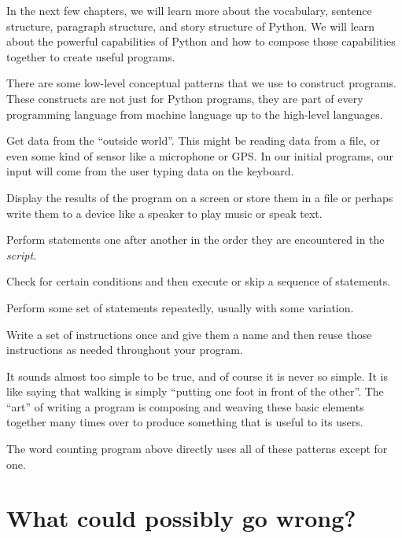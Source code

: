 In the next few chapters, we will learn more about the vocabulary, sentence structure, paragraph structure, and story structure of Python. We will learn about the powerful capabilities of Python and how to compose those capabilities together to create useful programs.

There are some low-level conceptual patterns that we use to construct programs. These constructs are not just for Python programs, they are part of every programming language from machine language up to the high-level languages.

\begin{description}
\tightlist
\item[input]
Get data from the ``outside world''. This might be reading data from a file, or even some kind of sensor like a microphone or GPS. In our initial programs, our input will come from the user typing data on the keyboard.
\item[output]
Display the results of the program on a screen or store them in a file or perhaps write them to a device like a speaker to play music or speak text.
\item[sequential execution]
 Perform statements one after another in the order they are encountered in the \emph{script}.
\item[conditional execution]
Check for certain conditions and then execute or skip a sequence of statements.
\item[repeated execution]
Perform some set of statements repeatedly, usually with some variation.
\item[reuse]
Write a set of instructions once and give them a name and then reuse those instructions as needed throughout your program.
\end{description}

It sounds almost too simple to be true, and of course it is never so simple. It is like saying that walking is simply ``putting one foot in front of the other''. The ``art'' of writing a program is composing and weaving these basic elements together many times over to produce something that is useful to its users.

The word counting program above directly uses all of these patterns except for one.

\hypertarget{quuxe9-cosas-pueden-ir-mal}{%
\section{What could possibly go wrong?}\label{quuxe9-cosas-pueden-ir-mal}}


